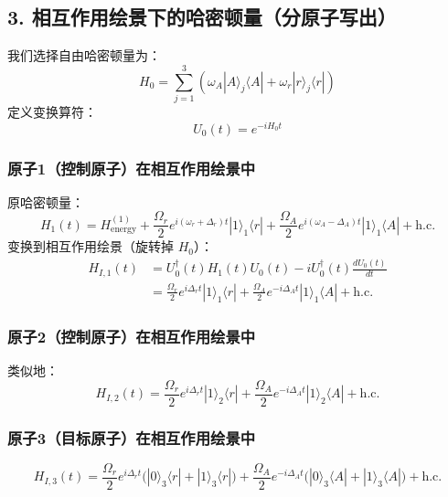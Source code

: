 \documentclass[12pt]{article}
\begin{document}
	\subsection*{3. 相互作用绘景下的哈密顿量（分原子写出）}
	我们选择自由哈密顿量为：
	\begin{equation}
		H_0 = \sum_{j=1}^3 \left( \omega_A |A\rangle_j\langle A| + \omega_r |r\rangle_j\langle r| \right)
	\end{equation}
	定义变换算符：
	\begin{equation}
		U_0(t) = e^{-iH_0 t}
	\end{equation}
	
	\subsubsection*{原子1（控制原子）在相互作用绘景中}
	原哈密顿量：
	\begin{equation}
		H_1(t) = H_{\text{energy}}^{(1)} + \frac{\Omega_r}{2} e^{i(\omega_r + \Delta_r)t} |1\rangle_1\langle r| + \frac{\Omega_A}{2} e^{i(\omega_A - \Delta_A)t} |1\rangle_1\langle A| + \text{h.c.}
	\end{equation}
	变换到相互作用绘景（旋转掉 $H_0$）：
	\begin{equation}
		\begin{aligned}
			H_{I,1}(t) &= U_0^\dagger(t) H_1(t) U_0(t) - i U_0^\dagger(t) \frac{dU_0(t)}{dt} \\
			&= \frac{\Omega_r}{2} e^{i\Delta_r t} |1\rangle_1\langle r| + \frac{\Omega_A}{2} e^{-i\Delta_A t} |1\rangle_1\langle A| + \text{h.c.}
		\end{aligned}
	\end{equation}
	
	\subsubsection*{原子2（控制原子）在相互作用绘景中}
	类似地：
	\begin{equation}
		H_{I,2}(t) = \frac{\Omega_r}{2} e^{i\Delta_r t} |1\rangle_2\langle r| + \frac{\Omega_A}{2} e^{-i\Delta_A t} |1\rangle_2\langle A| + \text{h.c.}
	\end{equation}
	
	\subsubsection*{原子3（目标原子）在相互作用绘景中}
	\begin{equation}
		H_{I,3}(t) = \frac{\Omega_r}{2} e^{i\Delta_r t} \big( |0\rangle_3\langle r| + |1\rangle_3\langle r| \big) + \frac{\Omega_A}{2} e^{-i\Delta_A t} \big( |0\rangle_3\langle A| + |1\rangle_3\langle A| \big) + \text{h.c.}
	\end{equation}
	
\end{document}
